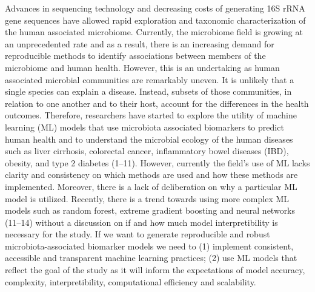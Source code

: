 \documentclass[11pt,]{article}
\begin{document}
Advances in sequencing technology and decreasing costs of generating 16S
rRNA gene sequences have allowed rapid exploration and taxonomic
characterization of the human associated microbiome. Currently, the
microbiome field is growing at an unprecedented rate and as a result,
there is an increasing demand for reproducible methods to identify
associations between members of the microbiome and human health.
However, this is an undertaking as human associated microbial
communities are remarkably uneven. It is unlikely that a single species
can explain a disease. Instead, subsets of those communities, in
relation to one another and to their host, account for the differences
in the health outcomes. Therefore, researchers have started to explore
the utility of machine learning (ML) models that use microbiota
associated biomarkers to predict human health and to understand the
microbial ecology of the human diseases such as liver cirrhosis,
colorectal cancer, inflammatory bowel diseases (IBD), obesity, and type
2 diabetes (1--11). However, currently the field's use of ML lacks
clarity and consistency on which methods are used and how these methods
are implemented. Moreover, there is a lack of deliberation on why a
particular ML model is utilized. Recently, there is a trend towards
using more complex ML models such as random forest, extreme gradient
boosting and neural networks (11--14) without a discussion on if and how
much model interpretibility is necessary for the study. If we want to
generate reproducible and robust microbiota-associated biomarker models
we need to (1) implement consistent, accessible and transparent machine
learning practices; (2) use ML models that reflect the goal of the study
as it will inform the expectations of model accuracy, complexity,
interpretibility, computational efficiency and scalability.
\end{document}
